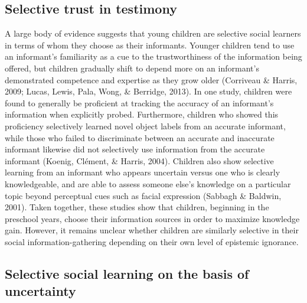 \documentclass[floatsintext,man]{apa6}
\theoremstyle{definition}
\theoremstyle{definition}
\theoremstyle{definition}
\theoremstyle{remark}
\begin{document}
\subsection{Selective trust in
testimony}\label{selective-trust-in-testimony}

A large body of evidence suggests that young children are selective
social learners in terms of whom they choose as their informants.
Younger children tend to use an informant's familiarity as a cue to the
trustworthiness of the information being offered, but children gradually
shift to depend more on an informant's demonstrated competence and
expertise as they grow older (Corriveau \& Harris, 2009; Lucas, Lewis,
Pala, Wong, \& Berridge, 2013). In one study, children were found to
generally be proficient at tracking the accuracy of an informant's
information when explicitly probed. Furthermore, children who showed
this proficiency selectively learned novel object labels from an
accurate informant, while those who failed to discriminate between an
accurate and inaccurate informant likewise did not selectively use
information from the accurate informant (Koenig, Clément, \& Harris,
2004). Children also show selective learning from an informant who
appears uncertain versus one who is clearly knowledgeable, and are able
to assess someone else's knowledge on a particular topic beyond
perceptual cues such as facial expression (Sabbagh \& Baldwin, 2001).
Taken together, these studies show that children, beginning in the
preschool years, choose their information sources in order to maximize
knowledge gain. However, it remains unclear whether children are
similarly selective in their social information-gathering depending on
their own level of epistemic ignorance.

\subsection{Selective social learning on the basis of
uncertainty}\label{selective-social-learning-on-the-basis-of-uncertainty}
\end{document}
